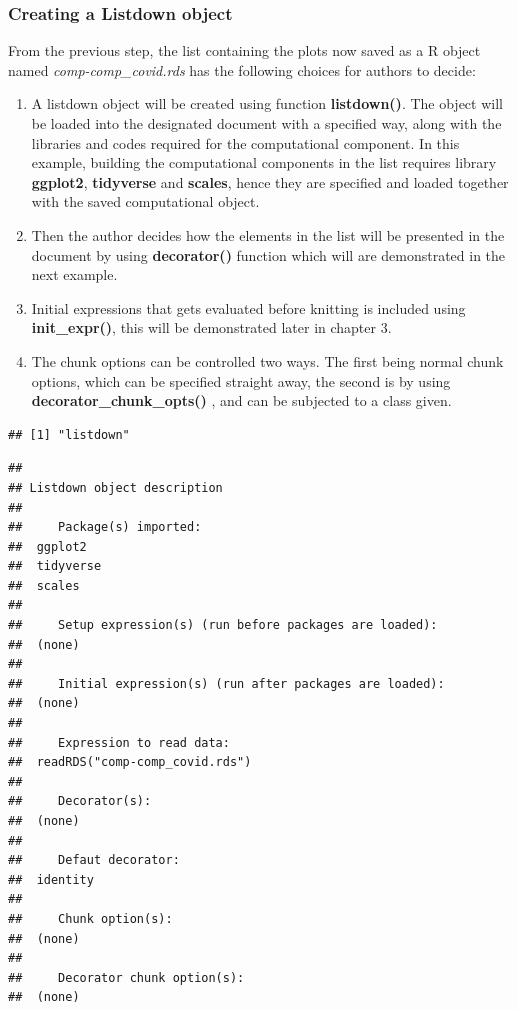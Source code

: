 \documentclass[
]{article}
\begin{document}
\hypertarget{creating-a-listdown-object}{%
\subsubsection{Creating a Listdown
object}\label{creating-a-listdown-object}}

From the previous step, the list containing the plots now saved as a R
object named \emph{comp-comp\_covid.rds} has the following choices for
authors to decide:

\begin{enumerate}
\def\labelenumi{\arabic{enumi}.}
\item
  A listdown object will be created using function \textbf{listdown()}.
  The object will be loaded into the designated document with a
  specified way, along with the libraries and codes required for the
  computational component. In this example, building the computational
  components in the list requires library \textbf{ggplot2},
  \textbf{tidyverse} and \textbf{scales}, hence they are specified and
  loaded together with the saved computational object.
\item
  Then the author decides how the elements in the list will be presented
  in the document by using \textbf{decorator()} function which will are
  demonstrated in the next example.
\item
  Initial expressions that gets evaluated before knitting is included
  using \textbf{init\_expr()}, this will be demonstrated later in
  chapter 3.
\item
  The chunk options can be controlled two ways. The first being normal
  chunk options, which can be specified straight away, the second is by
  using \textbf{decorator\_chunk\_opts()} , and can be subjected to a
  class given.
\end{enumerate}

\begin{verbatim}
## [1] "listdown"
\end{verbatim}

\begin{verbatim}
## 
## Listdown object description
## 
##     Package(s) imported:
##  ggplot2
##  tidyverse
##  scales
## 
##     Setup expression(s) (run before packages are loaded):
##  (none)
## 
##     Initial expression(s) (run after packages are loaded):
##  (none)
## 
##     Expression to read data:
##  readRDS("comp-comp_covid.rds")
## 
##     Decorator(s):
##  (none)
## 
##     Defaut decorator:
##  identity
## 
##     Chunk option(s):
##  (none)
## 
##     Decorator chunk option(s):
##  (none)
\end{verbatim}
\end{document}

